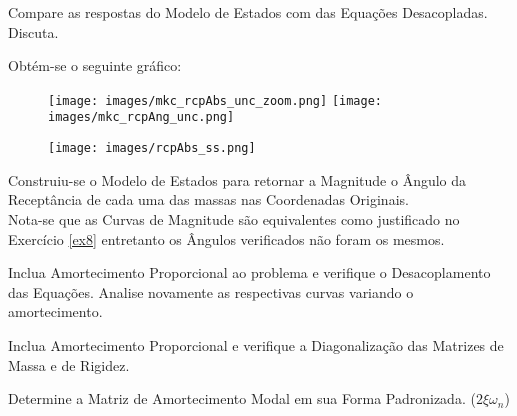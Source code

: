 \documentclass{article}
\begin{document}
\newpage\begin{exercise}\label{ex11}
    Compare as respostas do Modelo de Estados com das Equações Desacopladas. Discuta.
\end{exercise}
\begin{resolution}
    Obtém-se o seguinte gráfico:
    \begin{figure}[H]
        \centering
        \texttt{[image: images/mkc\_rcpAbs\_unc\_zoom.png]}
        \texttt{[image: images/mkc\_rcpAng\_unc.png]}
    \end{figure}
    \begin{figure}[H]
        \centering
        \texttt{[image: images/rcpAbs\_ss.png]}
    \end{figure}
    Construiu-se o Modelo de Estados para retornar a Magnitude o Ângulo da Receptância de cada uma das massas nas Coordenadas Originais.\\

    Nota-se que as Curvas de Magnitude são equivalentes como justificado no Exercício \ref{ex8} entretanto os Ângulos verificados não foram os mesmos.
\end{resolution}


\newpage\begin{exercise}\label{ex12}
    Inclua Amortecimento Proporcional ao problema e verifique o Desacoplamento das Equações. Analise novamente as respectivas curvas variando o amortecimento.
\end{exercise}
\begin{resolution}
    
\end{resolution}


\newpage\begin{exercise}\label{ex13}
    Inclua Amortecimento Proporcional e verifique a Diagonalização das Matrizes de Massa e de Rigidez.
\end{exercise}
\begin{resolution}
    
\end{resolution}


\newpage\begin{exercise}\label{ex14}
    Determine a Matriz de Amortecimento Modal em sua Forma Padronizada. ($2\xi\omega_n$)
\end{exercise}
\begin{resolution}
    
\end{resolution}
\end{document}
